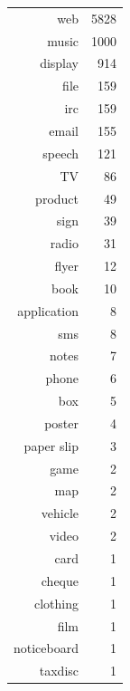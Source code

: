 \documentclass[xcolor=x11names,compress]{beamer}
\begin{document}
{\begin{columns}
        \begin{table}[ht]
            \centering
            \begin{tabular}{rr}
                web & 5828 \\ 
                music & 1000 \\ 
                display & 914 \\ 
                file & 159 \\ 
                irc & 159 \\ 
                email & 155 \\ 
                speech & 121 \\ 
                TV &  86 \\ 
                product &  49 \\ 
                sign &  39 \\ 
                radio &  31 \\ 
                flyer &  12 \\ 
                book &  10 \\ 
                application &   8 \\ 
                sms &   8 \\ 
                notes &   7 \\ 
                phone &   6 \\ 
                box &   5 \\ 
                poster &   4 \\ 
                paper slip &   3 \\ 
                game &   2 \\ 
                map &   2 \\ 
                vehicle &   2 \\ 
                video &   2 \\ 
                card &   1 \\ 
                cheque &   1 \\ 
                clothing &   1 \\ 
                film &   1 \\ 
                noticeboard &   1 \\ 
                taxdisc &   1
            \end{tabular}
        \end{table}


    \end{columns}

    \note{}
}
\end{document}
